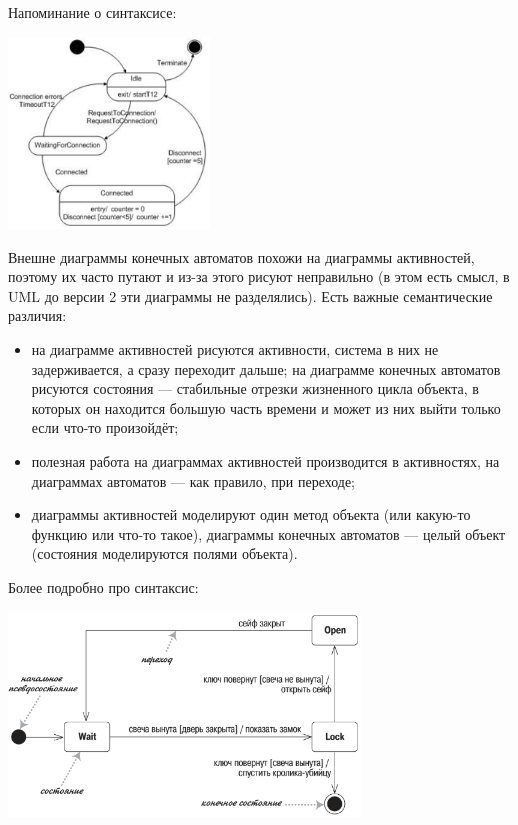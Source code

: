 \documentclass{../mcstext}
\begin{document}
Напоминание о синтаксисе:

\begin{center}
    \includegraphics[width=0.4\textwidth]{stateTransitionExample.png}
\end{center}

Внешне диаграммы конечных автоматов похожи на диаграммы активностей, поэтому их часто путают и из-за этого рисуют неправильно (в этом есть смысл, в UML до версии 2 эти диаграммы не разделялись). Есть важные семантические различия:

\begin{itemize}
    \item на диаграмме активностей рисуются активности, система в них не задерживается, а сразу переходит дальше; на диаграмме конечных автоматов рисуются состояния --- стабильные отрезки жизненного цикла объекта, в которых он находится большую часть времени и может из них выйти только если что-то произойдёт;
    \item полезная работа на диаграммах активностей производится в активностях, на диаграммах автоматов --- как правило, при переходе;
    \item диаграммы активностей моделируют один метод объекта (или какую-то функцию или что-то такое), диаграммы конечных автоматов --- целый объект (состояния моделируются полями объекта).
\end{itemize}

Более подробно про синтаксис:

\begin{center}
    \includegraphics[width=0.7\textwidth]{stateTransitionSyntax.png}
\end{center}
\end{document}
